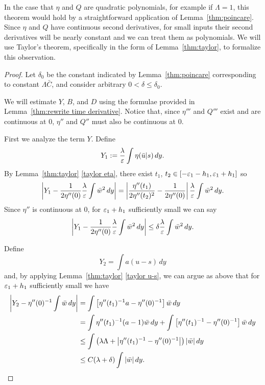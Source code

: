 In the case that $\eta$ and $Q$ are quadratic polynomials, for example if $\Lambda=1$, this theorem would hold by a straightforward application of Lemma~\ref{thm:poincare}. Since $\eta$ and $Q$ have continuous second derivatives, for small inputs their second derivatives will be nearly constant and we can treat them as polynomials.  We will use Taylor's theorem, specifically in the form of Lemma~\ref{thm:taylor}, to formalize this observation.  

\begin{proof}
Let $\delta_0$ be the constant indicated by Lemma~\ref{thm:poincare} corresponding to constant $\Lambda \bar{C}$, and consider arbitrary $0 < \delta \leq \delta_0$.  

We will estimate $Y$, $B$, and $D$ using the formulae provided in Lemma~\ref{thm:rewrite time derivative}.  Notice that, since $\eta'''$ and $Q'''$ exist and are continuous at 0, $\eta''$ and $Q''$ must also be continuous at 0.  

First we analyze the term $Y$.  Define
\[ Y_1 := \frac{\lambda}{\varepsilon} \int \eta(\bar{u}|s) \,dy. \]
By Lemma~\ref{thm:taylor} \ref{taylor eta}, there exist $t_1$, $t_2 \in [-\varepsilon_1-h_1, \varepsilon_1+h_1]$ so 
\[ \left\lvert  Y_1 - \frac{1}{2 \eta''(0)} \frac{\lambda}{\varepsilon} \int \bar{w}^2 \,dy  \right\rvert = \left\lvert \frac{\eta''(t_1)}{2\eta''(t_2)^2} - \frac{1}{2\eta''(0)} \right\rvert \frac{\lambda}{\varepsilon} \int \bar{w}^2 \, dy. \]
Since $\eta''$ is continuous at 0, for $\varepsilon_1 + h_1$ sufficiently small we can say
\[ \left\lvert  Y_1 - \frac{1}{2 \eta''(0)} \frac{\lambda}{\varepsilon} \int \bar{w}^2 \,dy  \right\rvert \leq \delta \frac{\lambda}{\varepsilon} \int \bar{w}^2 \,dy. \] 

Define
\[ Y_2 = \int a (u-s) \,dy \]
and, by applying Lemma~\ref{thm:taylor} \ref{taylor u-s}, we can argue as above that for $\varepsilon_1 + h_1$ sufficiently small we have
\begin{align*}
\left\lvert Y_2 - \eta''(0)^{-1} \int \bar{w} \,dy  \right\rvert &= \int \left[ \eta''(t_1)^{-1} a - \eta''(0)^{-1} \right] \bar{w} \,dy
\\ &= \int \eta''(t_1)^{-1} (a-1) \bar{w} \,dy + \int \left[ \eta''(t_1)^{-1} - \eta''(0)^{-1} \right] \bar{w} \,dy 
\\ &\leq \int \left( \lambda \Lambda + \left\lvert \eta''(t_1)^{-1} - \eta''(0)^{-1} \right\rvert \right) |\bar{w}| \,dy
\\ &\leq C (\lambda + \delta) \int |\bar{w}| \,dy.
\end{align*}


\end{proof}
